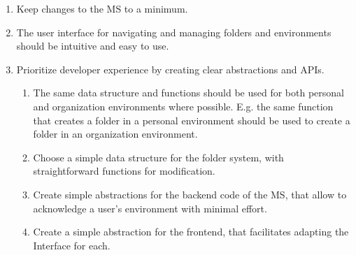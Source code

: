 \begin{enumerate}
	\item Keep changes to the MS to a minimum.


	\item The user interface for navigating and managing folders and environments should
	      be intuitive and easy to use.

	\item Prioritize developer experience by creating clear abstractions and APIs.
	      \begin{enumerate}
		      \item The same data structure and functions should be used for both personal and organization
		            environments where possible. E.g. the same function that creates a folder in a
		            personal environment should be used to create a folder in an organization environment.

		      \item Choose a simple data structure for the folder system, with straightforward
		            functions for modification.

		      \item Create simple abstractions for the backend code of the MS, that allow to
		            acknowledge a user's environment with minimal effort.

		      \item Create a simple abstraction for the frontend, that facilitates adapting
		            the Interface for each.
	      \end{enumerate}

\end{enumerate}

